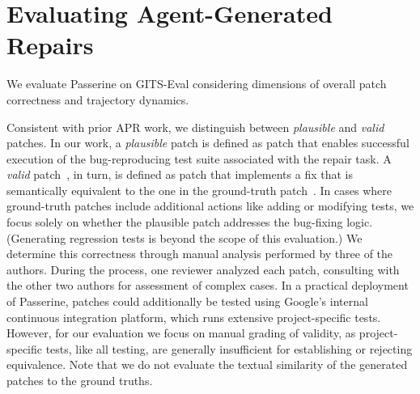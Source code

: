\section{Evaluating Agent-Generated Repairs}\label{sec:metrics}









We evaluate Passerine on GITS-Eval considering dimensions of overall patch correctness and trajectory dynamics.

 Consistent with prior APR work, we distinguish
between \emph{plausible} and \emph{valid} patches. In our work, a \emph{plausible} patch is
defined as patch that enables successful execution of the bug-reproducing test suite
associated with the repair task. A \emph{valid} patch~\cite{plausible1, plausible2, plausible3}, in turn, 
is defined as patch that implements a fix that is semantically equivalent to the one in the ground-truth patch~\cite{efficiencyofrepair,laregscalecorrectness}. In cases where ground-truth patches include additional actions like adding or modifying tests, we focus solely on whether the plausible patch addresses the bug-fixing logic.  (Generating regression tests is beyond the scope of this evaluation.)
We determine this correctness through manual analysis performed by three of the authors. During the process, one reviewer analyzed each patch, consulting with the other two authors for assessment of complex cases.
In a practical deployment of Passerine, patches could additionally be tested using Google's internal continuous integration platform, which runs extensive project-specific tests. However,
for our evaluation we focus on manual grading of validity, as  project-specific tests, like all testing, are generally insufficient for establishing or rejecting equivalence.
Note that we do not evaluate the textual similarity of the generated patches to the ground truths.
%












